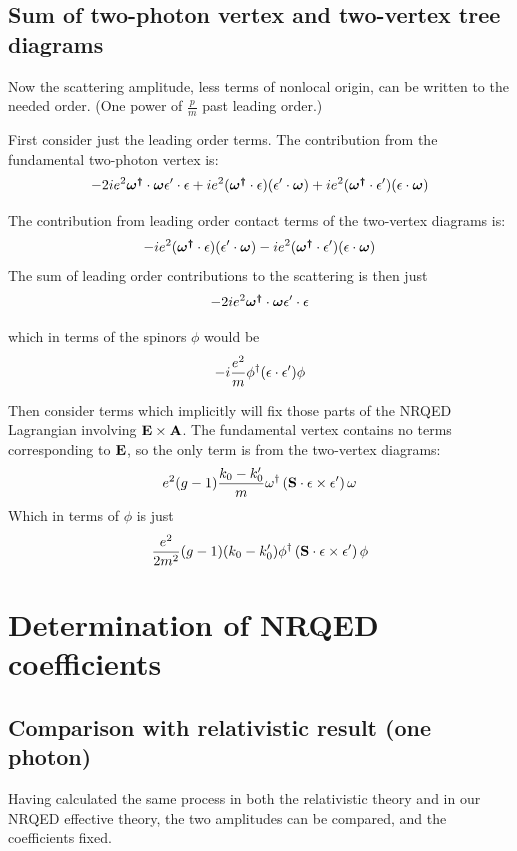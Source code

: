 \subsection{Sum of two-photon vertex and two-vertex tree diagrams}
Now the scattering amplitude, less terms of nonlocal origin, can be written to the needed order.  (One power of $\frac{p}{m}$ past leading order.) 

First consider just the leading order terms.  The contribution from the fundamental two-photon vertex is:
\[
-2 i e^2\mbox{\boldmath$ \omega^\dagger $} \cdot \mbox{\boldmath$ \omega $} \mathbf{\epsilon'} \cdot \mathbf{\epsilon}  
+ i e^2(\mbox{\boldmath$ \omega^\dagger $} \cdot  \mathbf{\epsilon}) (\mathbf{\epsilon'} \cdot \mbox{\boldmath$ \omega $})	
+ i e^2(\mbox{\boldmath$ \omega^\dagger $} \cdot  \mathbf{\epsilon'}) (\mathbf{\epsilon} \cdot \mbox{\boldmath$ \omega $})	
\]

The contribution from leading order contact terms of the two-vertex diagrams is:
\[
- i e^2 (\mbox{\boldmath$ \omega^\dagger $} \cdot \mathbf{\epsilon}) ( \mathbf{\epsilon'} \cdot \mbox{\boldmath$ \omega $}) - i e^2 (\mbox{\boldmath$ \omega^\dagger $} \cdot \mathbf{\epsilon'}) ( \mathbf{\epsilon} \cdot \mbox{\boldmath$ \omega $}) 
\]
The sum of leading order contributions to the scattering is then just 
\[
- 2 i e^2\mbox{\boldmath$ \omega^\dagger $} \cdot \mbox{\boldmath$ \omega $} \mathbf{\epsilon'} \cdot \mathbf{\epsilon}  
\]

which in terms of the spinors $\phi$ would be
\[
 - i\frac{e^2}{m} \phi^\dagger (\mathbf{\epsilon}\cdot \mathbf{\epsilon'} ) \phi
\]


Then consider terms which implicitly will fix those parts of the NRQED Lagrangian involving $\mathbf{E}\times \mathbf{A}$.  The fundamental vertex contains no terms corresponding to $\mathbf{E}$, so the only term is from the two-vertex diagrams:
\[
 e^2 (g-1) \frac{ k_0 - k'_0}{m} \omega^\dagger  \left( \mathbf{S} \cdot \mathbf{\epsilon} \times \mathbf{\epsilon'} \right ) \omega
\]
Which in terms of $\phi$ is just
\[
 \frac{e^2}{2m^2} (g-1) ( k_0 - k'_0 ) \phi^\dagger  \left( \mathbf{S} \cdot \mathbf{\epsilon} \times \mathbf{\epsilon'} \right ) \phi
\]





\section{Determination of NRQED coefficients}



\subsection{Comparison with relativistic result (one photon)}

Having calculated the same process in both the relativistic theory and in our NRQED effective theory, the two amplitudes can be compared, and the coefficients fixed.

